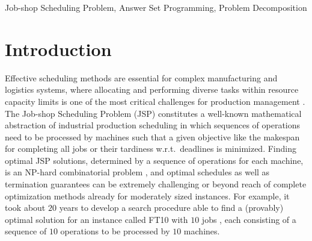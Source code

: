 \documentclass{tlp} %
\begin{document}
\begin{abstract}
\end{abstract}
%
\begin{keywords}
Job-shop Scheduling Problem, Answer Set Programming, Problem Decomposition
\end{keywords}
%
%
\section{Introduction}
Effective scheduling methods are essential for complex manufacturing and logistics systems,
where allocating and performing diverse tasks within resource capacity limits 
is one of the most critical challenges for production management \citep{uzsoy2000performance}.
The Job-shop Scheduling Problem (JSP) \citep{baker1974introduction,taillard1993benchmarks}
constitutes a well-known mathematical abstraction of industrial production scheduling in
which sequences of operations need to be processed by machines such that a given objective
like the makespan for completing all jobs or their tardiness w.r.t.\ deadlines is minimized.
Finding optimal JSP solutions, determined by a sequence of operations for each machine,
is an NP-hard combinatorial problem
\citep{garey1976complexity,lenstra1977complexity,liu2008prediction},
and optimal schedules as well as termination guarantees can be extremely challenging
or beyond reach 
of complete optimization methods already for moderately sized instances.
For example, it took about $20$ years to develop a search procedure able to find a
(provably) optimal solution for an instance called FT10 with $10$ jobs
\citep{adams1988shifting,zhang2010hybrid},
each consisting of a sequence of $10$ operations to be processed by $10$ machines. 
\end{document}
